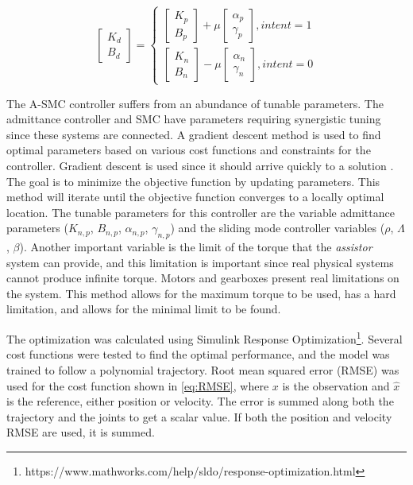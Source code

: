 \begin{equation}
    \begin{bmatrix} K_d \\ B_d \end{bmatrix} = \begin{cases}
        \begin{bmatrix} K_{p} \\ B_{p} \end{bmatrix} + \mu  \begin{bmatrix} \alpha_p  \\ \gamma_p \end{bmatrix}, intent = 1 \\
        \begin{bmatrix} K_{n} \\ B_{n} \end{bmatrix} - \mu  \begin{bmatrix} \alpha_n  \\ \gamma_n \end{bmatrix}, intent = 0
  \end{cases}
  \label{eq:varible}
\end{equation}


The A-SMC controller suffers from an abundance of tunable parameters. The admittance controller and SMC have parameters requiring synergistic tuning since these systems are connected.  A gradient descent method is used to find optimal parameters based on various cost functions and constraints for the controller.  Gradient descent is used since it should arrive quickly to a solution  \cite{piltan2012performance} \cite{wang1996course}. The goal is to minimize the objective function by updating parameters. This method will iterate until the objective function converges to a locally optimal location. The tunable parameters for this controller are the variable admittance parameters ($K_{n,p}$, $B_{n,p}$, $\alpha_{n,p}$, $\gamma_{n,p}$) and the sliding mode controller variables ($\rho$, $\Lambda$, $\beta$).  Another important variable is the limit of the torque that the \textit{assistor} system can provide, and this limitation is important since real physical systems cannot produce infinite torque. Motors and gearboxes present real limitations on the system. This method allows for the maximum torque to be used, has a hard limitation, and allows for the minimal limit to be found.


The optimization was calculated using Simulink Response Optimization\footnote{https://www.mathworks.com/help/sldo/response-optimization.html}. Several cost functions were tested to find the optimal performance, and the model was trained to follow a polynomial trajectory. Root mean squared error (RMSE) was used for the cost function shown in \autoref{eq:RMSE}, where $x$ is the observation and $\hat{x}$ is the reference, either position or velocity. The error is summed along both the trajectory and the joints to get a scalar value. If both the position and velocity RMSE are used, it is summed.

